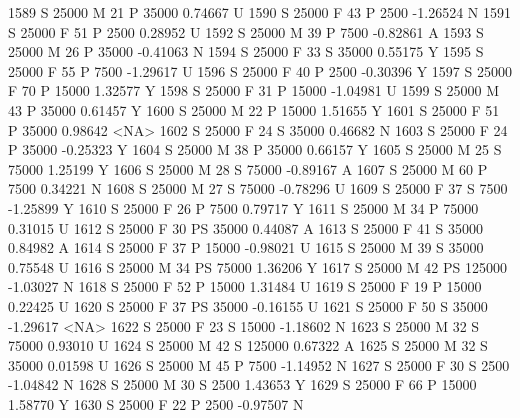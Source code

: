 \documentclass{article}
\begin{document}
\begin{Schunk}
\begin{Soutput}
1589      S      25000   M  21         P  35000   0.74667    U
1590      S      25000   F  43         P   2500  -1.26524    N
1591      S      25000   F  51         P   2500   0.28952    U
1592      S      25000   M  39         P   7500  -0.82861    A
1593      S      25000   M  26         P  35000  -0.41063    N
1594      S      25000   F  33         S  35000   0.55175    Y
1595      S      25000   F  55         P   7500  -1.29617    U
1596      S      25000   F  40         P   2500  -0.30396    Y
1597      S      25000   F  70         P  15000   1.32577    Y
1598      S      25000   F  31         P  15000  -1.04981    U
1599      S      25000   M  43         P  35000   0.61457    Y
1600      S      25000   M  22         P  15000   1.51655    Y
1601      S      25000   F  51         P  35000   0.98642 <NA>
1602      S      25000   F  24         S  35000   0.46682    N
1603      S      25000   F  24         P  35000  -0.25323    Y
1604      S      25000   M  38         P  35000   0.66157    Y
1605      S      25000   M  25         S  75000   1.25199    Y
1606      S      25000   M  28         S  75000  -0.89167    A
1607      S      25000   M  60         P   7500   0.34221    N
1608      S      25000   M  27         S  75000  -0.78296    U
1609      S      25000   F  37         S   7500  -1.25899    Y
1610      S      25000   F  26         P   7500   0.79717    Y
1611      S      25000   M  34         P  75000   0.31015    U
1612      S      25000   F  30        PS  35000   0.44087    A
1613      S      25000   F  41         S  35000   0.84982    A
1614      S      25000   F  37         P  15000  -0.98021    U
1615      S      25000   M  39         S  35000   0.75548    U
1616      S      25000   M  34        PS  75000   1.36206    Y
1617      S      25000   M  42        PS 125000  -1.03027    N
1618      S      25000   F  52         P  15000   1.31484    U
1619      S      25000   F  19         P  15000   0.22425    U
1620      S      25000   F  37        PS  35000  -0.16155    U
1621      S      25000   F  50         S  35000  -1.29617 <NA>
1622      S      25000   F  23         S  15000  -1.18602    N
1623      S      25000   M  32         S  75000   0.93010    U
1624      S      25000   M  42         S 125000   0.67322    A
1625      S      25000   M  32         S  35000   0.01598    U
1626      S      25000   M  45         P   7500  -1.14952    N
1627      S      25000   F  30         S   2500  -1.04842    N
1628      S      25000   M  30         S   2500   1.43653    Y
1629      S      25000   F  66         P  15000   1.58770    Y
1630      S      25000   F  22         P   2500  -0.97507    N

\end{Soutput}
\end{Schunk}
\end{document}

